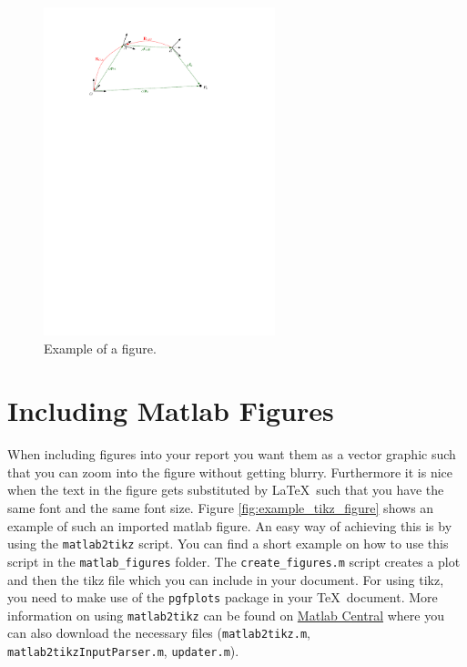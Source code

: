   \begin{figure}[h]
     \centering
     \includegraphics[width=0.6\textwidth]{img/notation.pdf}
     \caption{Example of a figure.}
     \label{img:notation}
  \end{figure}

\section{Including Matlab Figures}

When including figures into your report you want them as a vector graphic such that you can zoom into the figure without getting blurry.
Furthermore it is nice when the text in the figure gets substituted by \LaTeX\ such that you have the same font and the same font size.
Figure \ref{fig:example_tikz_figure} shows an example of such an imported matlab figure.
An easy way of achieving this is by using the \texttt{matlab2tikz} script.
You can find a short example on how to use this script in the \texttt{matlab\_figures} folder.
The \texttt{create\_figures.m} script creates a plot and then the tikz file which you can include in your document.
For using tikz, you need to make use of the \texttt{pgfplots} package in your \TeX\ document.
More information on using \texttt{matlab2tikz} can be found on \href{http://www.mathworks.com/matlabcentral/fileexchange/22022-matlab2tikz}{Matlab Central} where you can also download the necessary files (\texttt{matlab2tikz.m}, \texttt{matlab2tikzInputParser.m}, \texttt{updater.m}).

